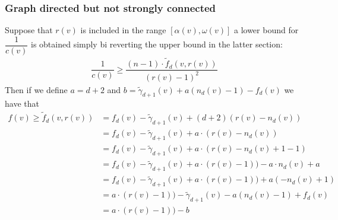 \subsubsection{Graph directed but not strongly connected}
Suppose that $ r(v) $ is included in the range $ [\alpha(v) , \omega(v)] $ a lower bound for $ \dfrac{1}{c(v)} $ is obtained simply bi reverting the upper bound in the latter section:
\begin{align*}
 \dfrac{1}{c(v)} \geq \dfrac{(n-1) \cdot \tilde{f}_d(v, r(v))}{(r(v) -1)^2}
\end{align*}
Then if we define $ a = d+2  $ and $ b = \tilde{\gamma}_{d+1}(v) + a(n_d(v) -1) - f_d(v) $ we have that
\begin{align*}
	f(v) \geq \tilde{f}_d(v, r(v)) &=  f_d(v)   - \tilde{\gamma}_{d+1}(v) + (d+2)(r(v) - n_d(v)) \\
	&=  f_d(v)   - \tilde{\gamma}_{d+1}(v) + a \cdot (r(v) - n_d(v)) \\
	&=  f_d(v)   - \tilde{\gamma}_{d+1}(v) + a \cdot (r(v) - n_d(v) + 1 - 1) \\
	&=  f_d(v)   - \tilde{\gamma}_{d+1}(v) + a \cdot (r(v) - 1))  - a \cdot n_d(v) + a\\
	&=  f_d(v)   - \tilde{\gamma}_{d+1}(v) + a \cdot (r(v) - 1))  + a (-  n_d(v) + 1)\\
	&=  a \cdot (r(v) - 1))   - \tilde{\gamma}_{d+1}(v)   - a (  n_d(v) -1)  + f_d(v)\\
	&= a \cdot (r(v) - 1))   - b
\end{align*}

